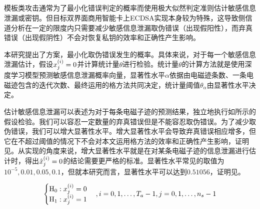 {{	\subsection{\jiashejianyanguji}
	模板类攻击通常为了最小化错误判定的概率而使用极大似然判定准则估计敏感信息泄漏或密钥。但目标双界面商用智能卡上ECDSA实现本身较为特殊，这导致侧信道分析在一定的限度内只需要减少敏感信息泄漏取伪错误（出现假阳性），而弃真错误（出现假阴性）不会对恢复私钥的效率和正确性产生影响。
	
	本研究提出了\jiashejianyanguji 方案，最小化取伪错误发生的概率。具体来说，对于每一个敏感信息泄漏估计，假设$x^{(i)}_j=0$并计算统计量$\theta$进行检验。统计量$\theta$的计算方法就是使用深度学习模型预测敏感信息泄漏概率向量，显著性水平$\alpha$依据由电磁迹条数、一条电磁迹包含的迭代次数、最终运用的格方法共同决定，统计量阈值$\theta_{\alpha}$由显著性水平决定。
	
	
	估计敏感信息泄漏可以表述为对于每条电磁子迹的预测结果，独立地执行如所示的假设检验。我们可以容忍一定数量的弃真错误但是不能容忍取伪错误。为了减少取伪错误，我们可以增大显著性水平。增大显著性水平会导致弃真错误相应增多，但它在不超过阈值的情况下不会对本文运用格方法的效率和正确性产生影响，证明见。从实现的角度来说，增大显著性水平就是在对某条电磁子迹的信息泄漏进行估计时，得出$\hat{x}^{(i)}_j=0$的结论需要更严格的标准。显著性水平常见的取值为$10^{-5},0.01,0.05,0.1$，但就本研究而言，显著性水平可以达到$0.51056$，证明见。
	
	\begin{equation}
		\begin{cases}
			\mathrm H_0:x^{(i)}_j=0\\
			\mathrm H_{1}:x^{(i)}_j=1
		\end{cases},i=0,1,\dots,T_a-1,j=0,1,\dots,n_s-1
		\label{eq:determindewhich}
	\end{equation}
	
}}
